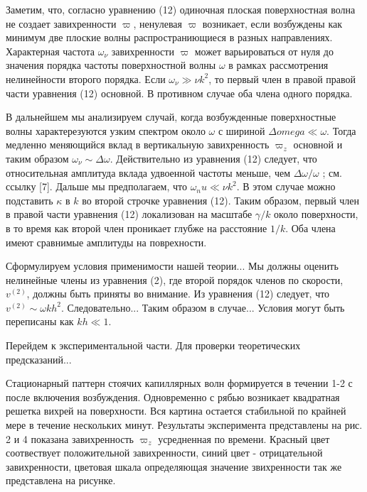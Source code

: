 Заметим, что, согласно уравнению (12) одиночная плоская поверхностная волна не создает завихренности $\varpi$, ненулевая $\varpi$ возникает, если возбуждены как минимум две плоские волны распространиющиеся в разных направлениях. Характерная частота $\omega_\nu$ завихренности $\varpi$ может варьироваться от нуля до значения порядка частоты поверхностной волны $\omega$ в рамках рассмотрения нелинейности второго порядка. Если $\omega_\nu \gg \nu k^2$, то первый член в правой правой части уравнения (12) основной. В противном случае оба члена одного порядка.

В дальнейшем мы анализируем случай, когда возбужденные поверхностные волны характерезуются узким спектром около $\omega$ с шириной $\Delta omega \ll \omega$. Тогда медленно меняющийся вклад в вертикальную завихренность $\varpi_z$ основной и таким образом $\omega_\nu \sim \Delta \omega$. Действительно из уравнения (12) следует, что относительная амплитуда вклада удвоенной частоты меньше, чем $\Delta \omega / \omega$ ; см. ссылку [7]. Дальше мы предполагаем, что $\omega_nu \ll \nu k^2$. В этом случае можно подставить $\kappa$ в $k$ во второй строчке уравнения (12). Таким образом, первый член в правой части уравнения (12) локализован на масштабе $\gamma/k$ около поверхности, в то время как второй член проникает глубже на расстояние $1/k$. Оба члена имеют сравнимые амплитуды на поврехности.

Сформулируем условия применимости нашей теории... Мы должны оценить нелинейные члены из уравнения (2), где второй порядок членов по скорости, $v^{(2)}$, должны быть приняты во внимание. Из уравнения (12) следует, что $v^{(2)} \sim \omega k h^2$. Следовательно... Таким образом в случае... Условия могут быть переписаны как $kh \ll 1$.

Перейдем к экспериментальной части. Для проверки теоретических предсказаний...

Стационарный паттерн стоячих капиллярных волн формируется в течении 1-2 с после включения возбуждения. Одновременно с рябью возникает квадратная решетка вихрей на поверхности. Вся картина остается стабильной по крайней мере в течение нескольких минут. Результаты эксперимента представлены на рис. 2 и 4 показана завихренность $\varpi_z$ усредненная по времени. Красный цвет соотвествует положительной завихренности, синий цвет - отрицательной завихренности, цветовая шкала определяющая значение звихренности так же представлена на рисунке.

